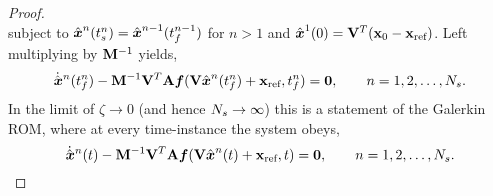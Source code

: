 \begin{proof}
\begin{equation*}
\end{equation*}
subject to $\genstateArg{n}{\timeStartArg{n}} = \genstateArg{n-1}{\timeEndArg{n-1}}$ for $n>1$ and $\genstateArg{1}{0} = \genstateIC $. Left multiplying by $\mass^{-1}$ yields,
\begin{equation*}
\genstateDotArg{n}{\timeEndArg{n}} -  \mass^{-1} \basisspace^T \stweightingMatArg{n} \velocity(\basisspace \genstateArg{n}{\timeEndArg{n}} + \stateIntercept ,\timeEndArg{n}) = \bz, \qquad n=1,2,\ldots,\nslabs. 
\end{equation*}
In the limit of $\zeta \rightarrow 0$ (and hence $\nslabs \rightarrow \infty$) this is a statement of the Galerkin ROM, where at every time-instance the system obeys,
\begin{equation*}
 \genstateDotArg{n}{t} - \mass^{-1} \basisspace^T \stweightingMatArg{n} \velocity(\basisspace \genstateArg{n}{t} + \stateIntercept ,t) = \bz, \qquad n=1,2,\ldots,\nslabs. 
\end{equation*}
\end{proof}
%

